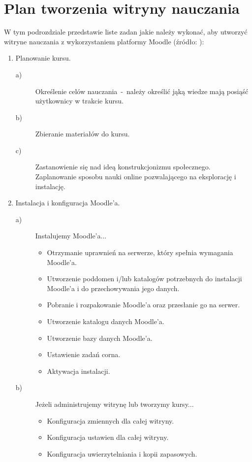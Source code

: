 \section{Plan tworzenia witryny nauczania} \label{roz:plan}
W tym podrozdziale przedstawie liste zadan jakie należy wykonać, aby utworzyć witryne nauczania z wykorzystaniem platformy Moodle (źródło: \cite{tworzenie_serwisow}):
\begin{enumerate}
	\item Planowanie kursu.
	\begin{description}
		\item[a)] Określenie celów nauczania~-~należy określić jąką wiedze mają posiąść użytkownicy w trakcie kursu.
		\item[b)] Zbieranie materiałów do kursu. 
		\item[c)] Zastanowienie się nad ideą konstrukcjonizmu społecznego. Zaplanowanie sposobu nauki online pozwalającego na eksplorację i instalację.
	\end{description}
	\item Instalacja i konfiguracja Moodle'a.
	\begin{description}
		\item[a)] Instalujemy Moodle'a...
		\begin{itemize}
			\item Otrzymanie uprawnień na serwerze, który spełnia wymagania Moodle'a.
			\item Utworzenie poddomen i/lub katalogów potrzebnych do instalacji Moodle'a i do przechowywania jego danych.
			\item Pobranie i rozpakowanie Moodle'a oraz przesłanie go na serwer.
			\item Utworzenie katalogu danych Moodle'a.
			\item Utworzenie bazy danych Moodle'a.
			\item Ustawienie zadań corna.
			\item Aktywacja instalacji.
		\end{itemize}
		\item[b)] Jeżeli administrujemy witrynę lub tworzymy kursy...
		\begin{itemize}
			\item Konfiguracja zmiennych dla całej witryny.
			\item Konfiguracja ustawien dla całej witryny.
			\item Konfiguracja uwierzytelniania i kopii zapasowych.
		\end{itemize}
	\end{description}

\end{enumerate}
